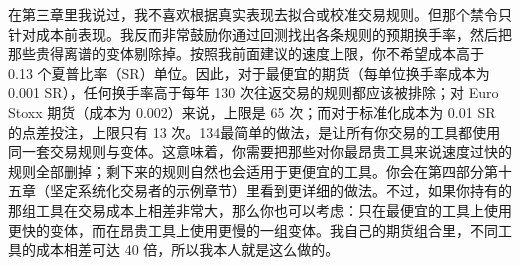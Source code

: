 \begin{chineseblock}在第三章里我说过，我不喜欢根据真实表现去拟合或校准交易规则。但那个禁令只针对成本前表现。我反而非常鼓励你通过回测找出各条规则的预期换手率，然后把那些贵得离谱的变体剔除掉。按照我前面建议的速度上限，你不希望成本高于 0.13 个夏普比率（SR）单位。因此，对于最便宜的期货（每单位换手率成本为 0.001 SR），任何换手率高于每年 130 次往返交易的规则都应该被排除；对 Euro Stoxx 期货（成本为 0.002）来说，上限是 65 次；而对于标准化成本为 0.01 SR 的点差投注，上限只有 13 次。134最简单的做法，是让所有你交易的工具都使用同一套交易规则与变体。这意味着，你需要把那些对你最昂贵工具来说速度过快的规则全部删掉；剩下来的规则自然也会适用于更便宜的工具。你会在第四部分第十五章（坚定系统化交易者的示例章节）里看到更详细的做法。不过，如果你持有的那组工具在交易成本上相差非常大，那么你也可以考虑：只在最便宜的工具上使用更快的变体，而在昂贵工具上使用更慢的一组变体。我自己的期货组合里，不同工具的成本相差可达 40 倍，所以我本人就是这么做的。\end{chineseblock}



